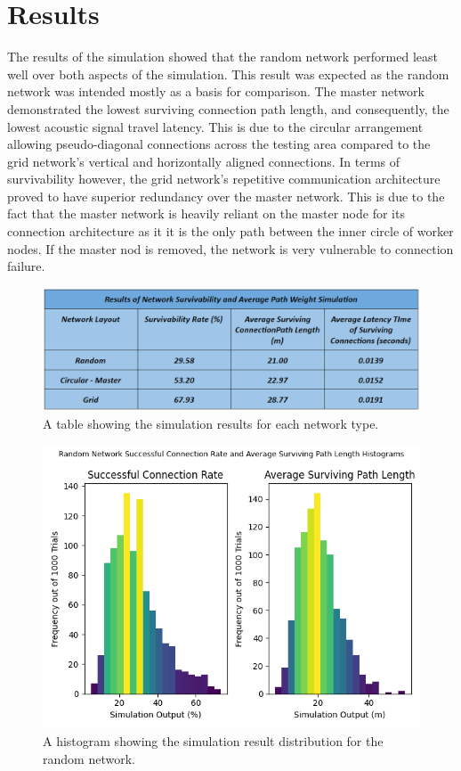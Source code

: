 \documentclass[10pt]{article}
\begin{document}
\section{Results}
The results of the simulation showed that the random network performed least well over both aspects of the simulation. This result was expected as the random network was intended mostly as a basis for comparison. The master network demonstrated the lowest surviving connection path length, and consequently, the lowest acoustic signal travel latency.  This is due to the circular arrangement allowing pseudo-diagonal connections across the testing area compared to the grid network’s vertical and horizontally aligned connections. In terms of survivability however, the grid network’s repetitive communication architecture proved to have superior redundancy over the master network. This is  due to the fact that the master network is heavily reliant on the master node for its connection architecture as it it is the only path between the inner circle of worker nodes. If the master nod is removed, the network is very vulnerable to connection failure.  

\begin{figure}
\begin{center}
\includegraphics[width=0.6\columnwidth]{tables/ResultsTable.PNG}
\end{center}
\caption{A table showing the simulation results for each network type.}
\end{figure}

\begin{figure}
\begin{center}
\includegraphics[width=0.6\columnwidth]{figures/RandomHistogram.png}
\end{center}
\caption{A histogram showing the simulation result distribution for the random network.}
\end{figure}
\end{document}
